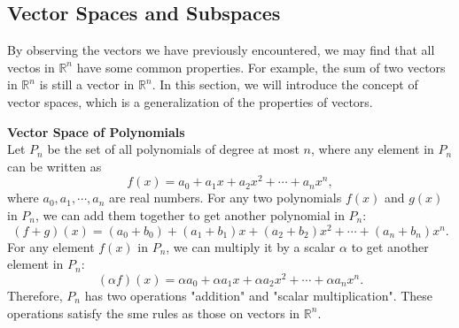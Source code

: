 \documentclass[10pt, a4paper]{article}
\newcommand{\R}{\mathbb{R}}
\begin{document}
\subsection{Vector Spaces and Subspaces}
By observing the vectors we have previously encountered, we may find that all vectos in $\R^n$ have some common properties. For example, the sum of two vectors in $\R^n$ is still a vector in $\R^n$. In this section, we will introduce the concept of vector spaces, which is a generalization of the properties of vectors.
\begin{example}
    \textbf{Vector Space of Polynomials}\\
    Let $P_n$ be the set of all polynomials of degree at most $n$, where any element in $P_n$ can be written as
    \begin{equation}
        f(x) = a_0 + a_1x + a_2x^2 + \cdots + a_nx^n,
    \end{equation}
    where $a_0, a_1, \cdots, a_n$ are real numbers. For any two polynomials $f(x)$ and $g(x)$ in $P_n$, we can add them together to get another polynomial in $P_n$:
    \begin{equation}
        (f+g)(x) = (a_0 + b_0) + (a_1 + b_1)x + (a_2 + b_2)x^2 + \cdots + (a_n + b_n)x^n.
    \end{equation}
    For any element $f(x)$  in $P_n$, we can multiply it by a scalar $\alpha$ to get another element in $P_n$:
    \begin{equation}
        (\alpha f)(x) = \alpha a_0 + \alpha a_1x + \alpha a_2x^2 + \cdots + \alpha a_nx^n.
    \end{equation}
    Therefore, $P_n$ has two operations "addition" and "scalar multiplication". These operations satisfy the sme rules as those on vectors in $\R^n$. \\
\end{example}
\end{document}
